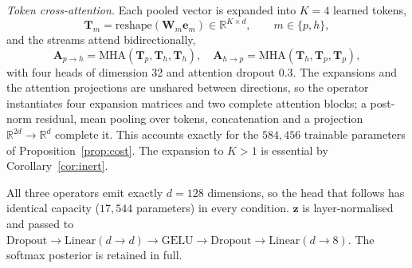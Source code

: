 \documentclass[journal,onecolumn,11pt,draftclsnofoot]{IEEEtran}   %
\begin{document}
\emph{Token cross-attention.} Each pooled vector is expanded into $K = 4$
learned tokens,
\begin{equation*}
  \mathbf{T}_m = \mathrm{reshape}(\mathbf{W}_m\mathbf{e}_m)
  \in \mathbb{R}^{K\times d}, \qquad m \in \{p, h\},
\end{equation*}
and the streams attend bidirectionally,
\begin{equation}
  \mathbf{A}_{p\rightarrow h} = \mathrm{MHA}(\mathbf{T}_p,\mathbf{T}_h,
  \mathbf{T}_h), \quad
  \mathbf{A}_{h\rightarrow p} = \mathrm{MHA}(\mathbf{T}_h,\mathbf{T}_p,
  \mathbf{T}_p),
  \label{eq:xattn}
\end{equation}
with four heads of dimension 32 and attention dropout 0.3. The expansions and
the attention projections are unshared between directions, so the operator
instantiates four expansion matrices and two complete attention blocks; a
post-norm residual, mean pooling over tokens, concatenation and a projection
$\mathbb{R}^{2d}\!\to\!\mathbb{R}^{d}$ complete it. This accounts exactly for the
$584{,}456$ trainable parameters of Proposition~\ref{prop:cost}. The expansion
to $K > 1$ is essential by Corollary~\ref{cor:inert}.

All three operators emit exactly $d = 128$ dimensions, so the head that follows
has identical capacity ($17{,}544$ parameters) in every condition.
$\mathbf{z}$ is layer-normalised and passed to
$\mathrm{Dropout} \rightarrow \mathrm{Linear}(d\!\to\!d) \rightarrow
\mathrm{GELU} \rightarrow \mathrm{Dropout} \rightarrow
\mathrm{Linear}(d\!\to\!8)$. The softmax posterior is retained in full.
\end{document}
